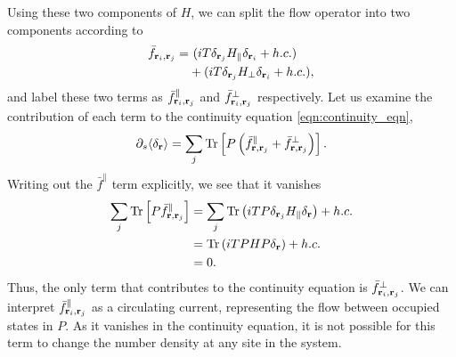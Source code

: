 Using these two components of $H$, we can split the flow operator into two components according to
\begin{align}
\begin{aligned}
    \bar f_{\textbf r_i, \textbf r_j} = 
    &\ (iT \delta_{\textbf r_j}H_\parallel \delta_{\textbf r_i } + h.c.)\\ 
    &+ 
    (iT \delta_{\textbf r_j}H_\perp \delta_{\textbf r_i } + h.c.),
\end{aligned}
\end{align}
and label these two terms as $\bar f^\parallel _{\textbf r_i, \textbf r_j}$ and $\bar f^\perp_{\textbf r_i, \textbf r_j}$ respectively. Let us examine the contribution of each term to the continuity equation \ref{eqn:continuity_eqn},
\begin{align}
    \partial_s \langle \delta_{\textbf r}\rangle = \sum_j \textup{Tr} \left [ 
    P \left (\bar f^{\parallel}_{\textbf r, \textbf r_j} + 
     \bar f^{\perp}_{\textbf r, \textbf r_j}\right )
    \right ].
\end{align}
Writing out the $\bar f^\parallel$ term explicitly, we see that it vanishes
\begin{align}\label{eqn:f_vanishes}
    \begin{aligned}
    \sum_j \textup{Tr} \left [ 
    P \bar f^{\parallel}_{\textbf r, \textbf r_j}
    \right ] &  = 
    \sum_j \textup{Tr} \left ( iT P 
    \delta_{\textbf r_j} H_{\parallel}\delta_{\textbf r}
    \right ) + h.c. \\ 
    & = \textup{Tr} \left ( 
      iT PHP \delta_{\textbf r}
    \right ) + h.c. \\ 
    &= 0.
    \end{aligned}
\end{align}
Thus, the only term that contributes to the continuity equation is $\bar f^\perp_{\textbf r_i, \textbf r_j}$. We can interpret $\bar f^\parallel_{\textbf r_i, \textbf r_j}$ as a circulating current, representing the flow between occupied states in $P$. As it vanishes in the continuity equation, it is not possible for this term to change the number density at any site in the system. 

